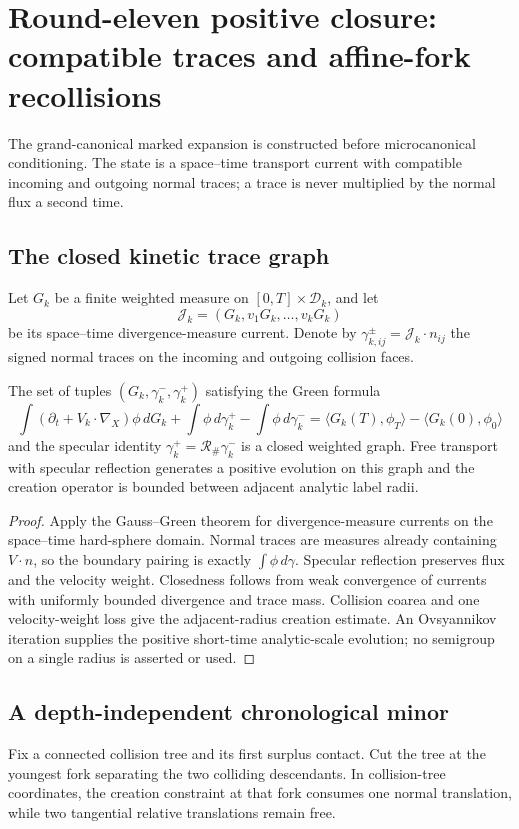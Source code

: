 \section{Round-eleven positive closure: compatible traces and affine-fork recollisions}
\label{sec:r11-b2}

The grand-canonical marked expansion is constructed before microcanonical
conditioning.  The state is a space--time transport current with compatible
incoming and outgoing normal traces; a trace is never multiplied by the
normal flux a second time.

\subsection{The closed kinetic trace graph}
Let $G_k$ be a finite weighted measure on
$[0,T]\times\mathcal D_k$, and let
\[
 \mathcal J_k=(G_k,v_1G_k,\ldots,v_kG_k)
\]
be its space--time divergence-measure current.  Denote by
$\gamma_{k,ij}^{\pm}=\mathcal J_k\cdot n_{ij}$ the signed normal traces on
the incoming and outgoing collision faces.

\begin{theorem}
\label{thm:r11-b2-trace}
The set of tuples $(G_k,\gamma_k^-,\gamma_k^+)$ satisfying the Green formula
\[
 \int(\partial_t+V_k\cdot\nabla_X)\phi\,dG_k
 +\int\phi\,d\gamma_k^+ -\int\phi\,d\gamma_k^-
 =\langle G_k(T),\phi_T\rangle-\langle G_k(0),\phi_0\rangle
\]
and the specular identity
$\gamma_k^+=\mathscr R_\#\gamma_k^-$ is a closed weighted graph.  Free
transport with specular reflection generates a positive evolution on this
graph and the creation operator is bounded between adjacent analytic label
radii.
\end{theorem}

\begin{proof}
Apply the Gauss--Green theorem for divergence-measure currents on the
space--time hard-sphere domain.  Normal traces are measures already containing
$V\cdot n$, so the boundary pairing is exactly $\int\phi\,d\gamma$.
Specular reflection preserves flux and the velocity weight.  Closedness follows
from weak convergence of currents with uniformly bounded divergence and trace
mass.  Collision coarea and one velocity-weight loss give the adjacent-radius
creation estimate.  An Ovsyannikov iteration supplies the positive short-time
analytic-scale evolution; no semigroup on a single radius is asserted or used.
\end{proof}

\subsection{A depth-independent chronological minor}
Fix a connected collision tree and its first surplus contact.  Cut the tree at
the youngest fork separating the two colliding descendants.  In collision-tree
coordinates, the creation constraint at that fork consumes one normal
translation, while two tangential relative translations remain free.

